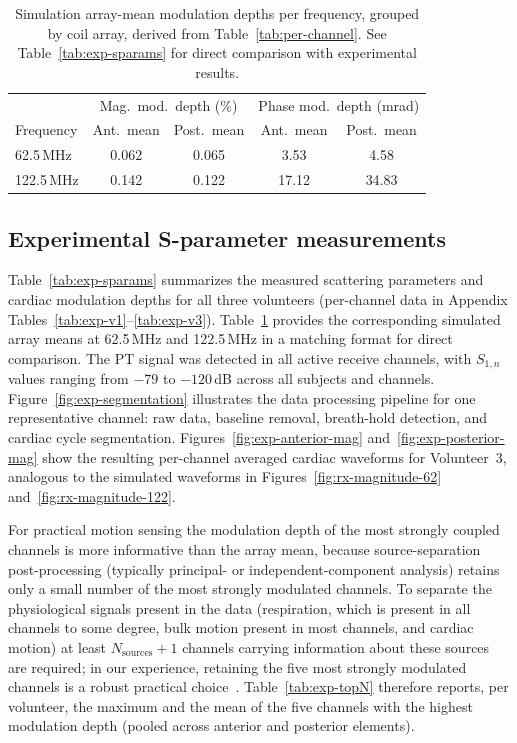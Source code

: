 \documentclass[
]{article}
\begin{document}
\begin{table}[htbp]
\centering
\caption{Simulation array-mean modulation depths per frequency, grouped by coil array, derived from Table~\ref{tab:per-channel}. See Table~\ref{tab:exp-sparams} for direct comparison with experimental results.}
\label{tab:sim-array-means}
\begin{tabular}{lcccc}
\hline
 & \multicolumn{2}{c}{Mag.\ mod.\ depth (\%)} & \multicolumn{2}{c}{Phase mod.\ depth (mrad)} \\
Frequency & Ant.\ mean & Post.\ mean & Ant.\ mean & Post.\ mean \\
\hline
62.5\,MHz  & 0.062 & 0.065 & 3.53 & 4.58 \\
122.5\,MHz & 0.142 & 0.122 & 17.12 & 34.83 \\
\hline
\end{tabular}
\end{table}

\subsection{Experimental S-parameter measurements}\label{experimental-results}

Table~\ref{tab:exp-sparams} summarizes the measured scattering parameters and cardiac modulation depths for all three volunteers (per-channel data in Appendix Tables~\ref{tab:exp-v1}--\ref{tab:exp-v3}). Table~\ref{tab:sim-array-means} provides the corresponding simulated array means at 62.5\,MHz and 122.5\,MHz in a matching format for direct comparison. The PT signal was detected in all active receive channels, with $S_{1,n}$ values ranging from $-79$ to $-120$\,dB across all subjects and channels. Figure~\ref{fig:exp-segmentation} illustrates the data processing pipeline for one representative channel: raw data, baseline removal, breath-hold detection, and cardiac cycle segmentation. Figures~\ref{fig:exp-anterior-mag} and~\ref{fig:exp-posterior-mag} show the resulting per-channel averaged cardiac waveforms for Volunteer~3, analogous to the simulated waveforms in Figures~\ref{fig:rx-magnitude-62} and~\ref{fig:rx-magnitude-122}.

For practical motion sensing the modulation depth of the most strongly coupled channels is more informative than the array mean, because source-separation post-processing (typically principal- or independent-component analysis) retains only a small number of the most strongly modulated channels. To separate the physiological signals present in the data (respiration, which is present in all channels to some degree, bulk motion present in most channels, and cardiac motion) at least $N_\text{sources}+1$ channels carrying information about these sources are required; in our experience, retaining the five most strongly modulated channels is a robust practical choice~\cite{Bacher2017CardiacStudy}. Table~\ref{tab:exp-topN} therefore reports, per volunteer, the maximum and the mean of the five channels with the highest modulation depth (pooled across anterior and posterior elements).
\end{document}

